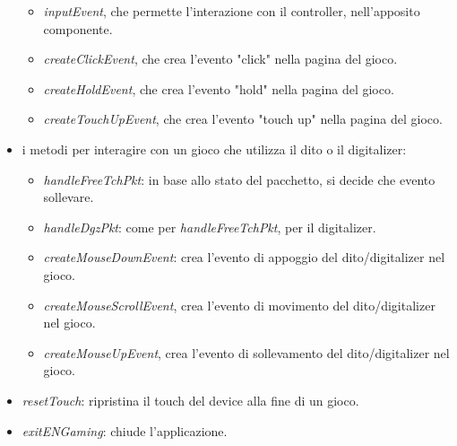 \begin{itemize}
\begin{itemize}
        \item \emph{inputEvent}, che permette l'interazione con il controller, nell'apposito componente.
        \item \emph{createClickEvent}, che crea l'evento "click" nella pagina del gioco.
        \item \emph{createHoldEvent}, che crea l'evento "hold" nella pagina del gioco.
        \item \emph{createTouchUpEvent}, che crea l'evento "touch up" nella pagina del gioco.
    \end{itemize}
    \item i metodi per interagire con un gioco che utilizza il dito o il digitalizer: \begin{itemize}
        \item \emph{handleFreeTchPkt}: in base allo stato del pacchetto, si decide che evento sollevare.
        \item \emph{handleDgzPkt}: come per \emph{handleFreeTchPkt}, per il digitalizer.
        \item \emph{createMouseDownEvent}: crea l'evento di appoggio del dito/digitalizer nel gioco.
        \item \emph{createMouseScrollEvent}, crea l'evento di movimento del dito/digitalizer nel gioco.
        \item \emph{createMouseUpEvent}, crea l'evento di sollevamento del dito/digitalizer nel gioco.
    \end{itemize}
    \item \emph{resetTouch}: ripristina il touch del device alla fine di un gioco.
    \item \emph{exitENGaming}: chiude l'applicazione.
\end{itemize}
\newpage
